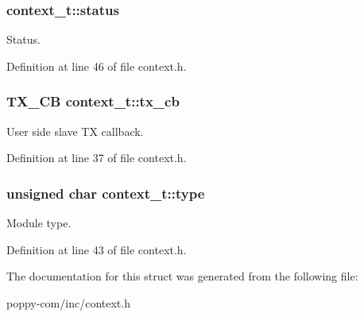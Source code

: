 \hypertarget{structcontext__t_a0e49b82a79be5df63399ddbcc0cc022c}{
\subsubsection[{status}]{ context\-\_\-t\-::status}}\label{structcontext__t_a0e49b82a79be5df63399ddbcc0cc022c}
Status. 

Definition at line 46 of file context.\-h.

\hypertarget{structcontext__t_a06d2b435c29a01be998e6383fec2ef50}{
\subsubsection[{tx\-\_\-cb}]{\setlength{\rightskip}{0pt plus 5cm}T\-X\-\_\-\-C\-B context\-\_\-t\-::tx\-\_\-cb}}\label{structcontext__t_a06d2b435c29a01be998e6383fec2ef50}
User side slave T\-X callback. 

Definition at line 37 of file context.\-h.

\hypertarget{structcontext__t_a2dbb966924ef90bfba1876ad8a3872af}{
\subsubsection[{type}]{\setlength{\rightskip}{0pt plus 5cm}unsigned char context\-\_\-t\-::type}}\label{structcontext__t_a2dbb966924ef90bfba1876ad8a3872af}
Module type. 

Definition at line 43 of file context.\-h.



The documentation for this struct was generated from the following file\-:\begin{DoxyCompactItemize}
\item 
poppy-\/com/inc/context.\-h\end{DoxyCompactItemize}
